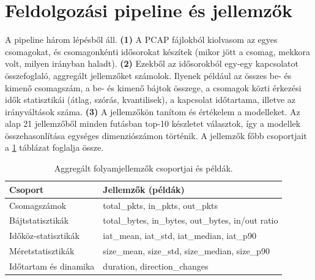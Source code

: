 \documentclass[a4paper,12pt]{article}
\begin{document}
\section{Feldolgozási pipeline és jellemzők}
A pipeline három lépésből áll. \textbf{(1)} A PCAP fájlokból kiolvasom az egyes csomagokat,
és csomagonkénti idősorokat készítek (mikor jött a csomag, mekkora volt, milyen irányban
haladt). \textbf{(2)} Ezekből az idősorokból egy-egy kapcsolatot összefoglaló, aggregált
jellemzőket számolok. Ilyenek például az összes be- és kimenő csomagszám, a be- és kimenő
bájtok összege, a csomagok közti érkezési idők statisztikái (átlag, szórás, kvantilisek),
a kapcsolat időtartama, illetve az irányváltások száma. \textbf{(3)} A jellemzőkön tanítom
és értékelem a modelleket.
Az alap 21 jellemzőből minden futásban top-10 készletet választok, így a modellek összehasonlítása
egységes dimenziószámon történik.
A jellemzők főbb csoportjait a \ref{tab:feature_groups} táblázat foglalja össze.

\begin{table}[hbt!]
    \caption{Aggregált folyamjellemzők csoportjai és példák.}
    \vspace{2mm}
    \centering
    \begin{tabular}{ll}
        \toprule
        \textbf{Csoport} & \textbf{Jellemzők (példák)} \\ \midrule
        Csomagszámok & total\_pkts, in\_pkts, out\_pkts \\
        Bájtstatisztikák & total\_bytes, in\_bytes, out\_bytes, in/out ratio \\
        Időköz-statisztikák & iat\_mean, iat\_std, iat\_median, iat\_p90 \\
        Méretstatisztikák & size\_mean, size\_std, size\_median, size\_p90 \\
        Időtartam és dinamika & duration, direction\_changes \\
        \bottomrule
    \end{tabular}
    \label{tab:feature_groups}
\end{table}
\end{document}
